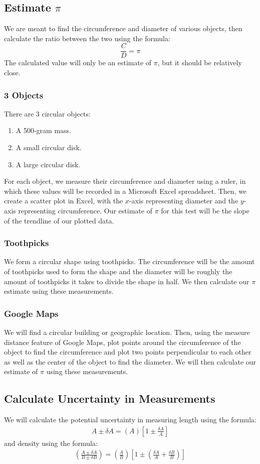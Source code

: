 \documentclass{article}
\begin{document}
\subsection{Estimate $\pi$}
We are meant to find the circumference and diameter of various objects, then calculate 
the ratio between the two using the formula:
\[ \frac{C}{D}=\pi \]
The calculated value will only be an estimate of $\pi$, but it should be relatively close.

\subsubsection{3 Objects}
There are 3 circular objects:
\begin{enumerate}
    \item A 500-gram mass.
    \item A small circular disk.
    \item A large circular disk.
\end{enumerate}
For each object, we measure their circumference and diameter using a ruler, in which these values
will be recorded in a Microsoft Excel spreadsheet. Then, we create a scatter plot in Excel, with 
the $x$-axis representing diameter and the $y$-axis representing circumference. Our estimate 
of $\pi$ for this test will be the slope of the trendline of our plotted data.

\subsubsection{Toothpicks}
We form a circular shape using toothpicks. The circumference will be the amount 
of toothpicks used to form the shape and the diameter will be roughly the amount 
of toothpicks it takes to divide the shape in half. We then calculate our $\pi$ 
estimate using these measurements.

\subsubsection{Google Maps}
We will find a circular building or geographic location. Then, using the measure
distance feature of Google Maps, plot points around the circumference of the object to 
find the circumference and plot two points perpendicular to each other as well as the center of 
the object to find the diameter. We will then calculate our estimate of $\pi$ using these 
measurements.

\subsection{Calculate Uncertainty in Measurements}
We will calculate the potential uncertainty in measuring length using the formula:
\begin{align}
    A \pm \delta A = (A)\left[1\pm\frac{\delta A}{A}\right]
\end{align}
and density using the formula:
\begin{align}
    \left(\frac{A\pm\delta A}{B\pm\delta B}\right) = \left(\frac{A}{B}\right)\left[1\pm\left(\frac{\delta A}{A}+\frac{\delta B}{B}\right)\right]\label{eq:2}
\end{align}
\end{document}
